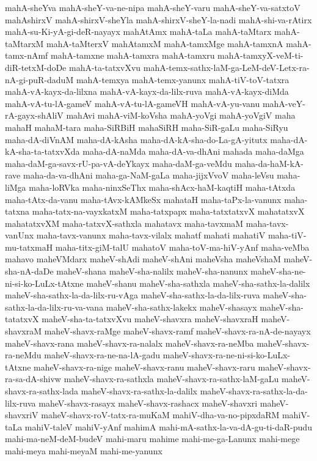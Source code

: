{mahA-sheYva
mahA-sheY-va-ne-nipa
mahA-sheY-varu
mahA-sheY-va-satxtoV
mahAshirxV
mahA-shirxV-sheYla
mahA-shirxV-sheY-la-nadi
mahA-shi-va-rAtirx
mahA-su-Ki-yA-gi-deR-nayayx
mahAtAmx
mahA-taLa
mahA-taMtarx
mahA-taMtarxM
mahA-taMterxV
mahAtamxM
mahA-tamxMge
mahA-tamxnA
mahA-tamx-nAmf
mahA-tamxne
mahA-tamxra
mahA-tamxru
mahA-tamxyX-veM-ti-diR-tetxM-doDe
mahA-ta-tatxvXvu
mahA-temx-sathx-laM-ga-LeM-deV-Letx-ra-nA-gi-puR-daduM
mahA-temxya
mahA-temx-yanunx
mahA-tiV-toV-tatxra
mahA-vA-kayx-da-lilxna
mahA-vA-kayx-da-lilx-ruva
mahA-vA-kayx-diMda
mahA-vA-tu-lA-gameV
mahA-vA-tu-lA-gameVH
mahA-vA-yu-vanu
mahA-veY-rA-gayx-shAliV
mahAvi
mahA-viM-koVsha
mahA-yoVgi
mahA-yoVgiV
maha
mahaH
mahaM-tara
maha-SiRBiH
mahaSiRH
maha-SiR-gaLu
maha-SiRyu
maha-dA-diVnAM
maha-dA-kAsha
maha-dA-kA-sha-do-La-gA-yitutx
maha-dA-kA-sha-ta-tatxvXda
maha-dA-naMda
maha-dA-va-dhAni
mahada
maha-daMga
maha-daM-ga-savx-rU-pa-vA-deYkayx
maha-daM-ga-veMdu
maha-da-haM-kA-rave
maha-da-va-dhAni
maha-ga-NaM-gaLa
maha-jijxVvoV
maha-leVsu
maha-liMga
maha-loRVka
maha-ninxSeThx
maha-shAcx-haM-kaqtiH
maha-tAtxda
maha-tAtx-da-vanu
maha-tAvx-kAMkeSx
mahataH
maha-taPx-la-vanunx
maha-tatxna
maha-tatx-na-vayxkatxM
maha-tatxpapx
maha-tatxtatxvX
mahatatxvX
mahatatxvXM
maha-tatxvX-sathxla
mahatavx
maha-tavxmaM
maha-tavx-vanUnx
maha-tavx-vanunx
maha-tavx-vilalx
mahatf
mahati
mahatiV
maha-tiV-mu-tatxmaH
maha-titx-giM-talU
mahatoV
maha-toV-ma-hiV-yAnf
maha-veMba
mahavo
maheVMdarx
maheV-shAdi
maheV-shAni
maheVsha
maheVshaM
maheV-sha-nA-daDe
maheV-shana
maheV-sha-nalilx
maheV-sha-nanunx
maheV-sha-ne-ni-si-ko-LuLx-tAtxne
maheV-shanu
maheV-sha-sathxla
maheV-sha-sathx-la-dalilx
maheV-sha-sathx-la-da-lilx-ru-vAga
maheV-sha-sathx-la-da-lilx-ruva
maheV-sha-sathx-la-da-lilx-ru-va-vana
maheV-sha-sathx-lakekx
maheV-shasayx
maheV-sha-tatatxvX
maheV-sha-ta-tatxvXvu
maheV-shavxra
maheV-shavxraH
maheV-shavxraM
maheV-shavx-raMge
maheV-shavx-ramf
maheV-shavx-ra-nA-de-nayayx
maheV-shavx-rana
maheV-shavx-ra-nalalx
maheV-shavx-ra-neMba
maheV-shavx-ra-neMdu
maheV-shavx-ra-ne-na-lA-gadu
maheV-shavx-ra-ne-ni-si-ko-LuLx-tAtxne
maheV-shavx-ra-nige
maheV-shavx-ranu
maheV-shavx-raru
maheV-shavx-ra-sa-dA-shivw
maheV-shavx-ra-sathxla
maheV-shavx-ra-sathx-laM-gaLu
maheV-shavx-ra-sathx-lada
maheV-shavx-ra-sathx-la-dalilx
maheV-shavx-ra-sathx-la-da-lilx-ruva
maheV-shavx-rasayx
maheV-shavx-rashacx
maheV-shavxri
maheV-shavxriV
maheV-shavx-roV-tatx-ra-muKaM
mahiV-dha-va-no-pipxdaRM
mahiV-taLa
mahiV-taleV
mahiV-yAnf
mahimA
mahi-mA-sathx-la-va-dA-gu-ti-daR-pudu
mahi-ma-neM-deM-budeV
mahi-maru
mahime
mahi-me-ga-Lanunx
mahi-mege
mahi-meya
mahi-meyaM
mahi-me-yanunx
}
